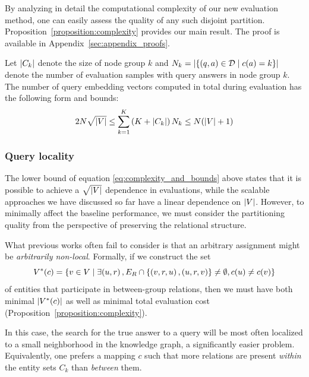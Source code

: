 By analyzing in detail the computational complexity of our new evaluation method, one can easily assess the quality of any such disjoint partition. 
Proposition~\ref{proposition:complexity} provides our main result. The proof is available in Appendix~\ref{sec:appendix_proofs}.
\begin{proposition}
\label{proposition:complexity}
Let $\mathopen{}\left|C_k\right|$ denote the size of node group $k$ and $N_k=\mathopen{}\left|\mathopen{}\left\{\mathopen{}\left(q, a\right) \in \mathcal{D} \mid c\mathopen{}\left(a\right)=k\right\}\right|$ denote the number of evaluation samples with query answers in node group $k$. The number of query embedding vectors computed in total during evaluation has the following form and bounds:
\begin{equation}
\label{eq:complexity_and_bounds}
2 N \sqrt{\mathopen{}\left|V\right|} \leq \sum_{k=1}^{K}{\mathopen{}\left(K+\mathopen{}\left|C_k\right|\right)N_k} \leq N \mathopen{}\left(\mathopen{}\left|V\right| + 1\right) 
\end{equation}
\end{proposition}

\subsubsection{Query locality}
The lower bound of equation \eqref{eq:complexity_and_bounds} above states that it is possible to achieve a $\sqrt{\mathopen{}\left|V\right|}$ dependence in evaluations, while the scalable approaches we have discussed so far have a linear dependence on ${\mathopen{}\left|V\right|}$. 
However, to minimally affect the baseline performance, we must consider the partitioning quality from the perspective of preserving the relational structure. 

What previous works often fail to consider is that an arbitrary assignment might be \emph{arbitrarily non-local}. Formally, if we construct the set 
\begin{equation}
V^*\mathopen{}\left(c\right)=\mathopen{}\left\{v \in V \mid \exists \mathopen{}\left(u,r\right), E_R \cap \mathopen{}\left\{\mathopen{}\left(v,r,u\right), \mathopen{}\left(u, r, v\right)\right\} \neq \emptyset, c\mathopen{}\left(u\right) \neq c\mathopen{}\left(v\right)\right\}    
\end{equation}
of entities that participate in between-group relations, then we must have both minimal $\mathopen{}\left|V^*\mathopen{}\left(c\right)\right|$ as well as minimal total evaluation cost (Proposition~\ref{proposition:complexity}). 

In this case, the search for the true answer to a query will be most often localized to a small neighborhood in the knowledge graph, a significantly easier problem. Equivalently, one prefers a mapping $c$ such that more relations are present \emph{within} the entity sets $C_k$ than \emph{between} them. 

